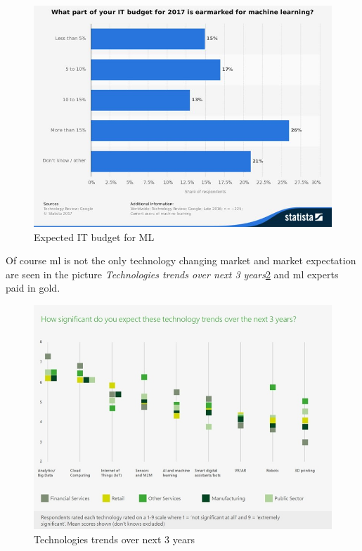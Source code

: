 \documentclass[thesis=M,english]{FITthesis}[2012/06/26]
\begin{document}
\begin{figure}[h!]\centering
	\includegraphics[width=1\textwidth]{pictures/ml_budget}
	\caption{Expected IT budget for ML\cite{ml_realword}}\label{fig:ml_budget}
\end{figure}

Of course \acrshort{ml} is not the only technology changing market and market expectation are seen in the picture \textit{Technologies trends over next 3 years}\ref{fig:ml_changing_market} and \acrshort{ml} experts paid in gold.

\begin{figure}[h!]\centering
	\includegraphics[width=1\textwidth]{pictures/ml_changing_market}
	\caption{Technologies trends over next 3 years\cite{ml_realword}}\label{fig:ml_changing_market}
\end{figure}
\end{document}
